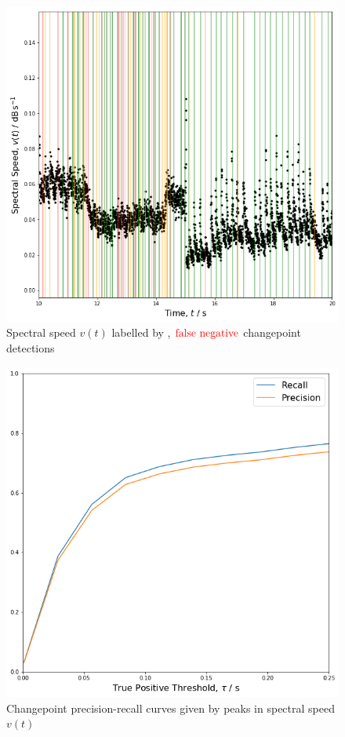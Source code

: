 \documentclass{article}[12pt]
\numberwithin{equation}{section}
\begin{document}
\begin{figure}[H]
\centering{}
\captionsetup{justification=centering}
\includegraphics[scale=0.5]{detections}
\caption{
Spectral speed $v(t)$ labelled by \color{DarkGreen}{true positive}, \color{orange}{false positive}
$\color{red}{\text{false negative}}$ changepoint detections
}
\label{fig:speed}
\end{figure}
\begin{figure}[H]
\centering{}
\captionsetup{justification=centering}
\includegraphics[scale=0.5]{pr}
\caption{
Changepoint precision-recall curves given by peaks in spectral speed $v(t)$
}
\label{fig:pr}
\end{figure}
\end{document}
